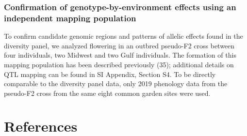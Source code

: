 \documentclass[
  9pt,
  twocolumn,
  twoside]{pnas-new}
\begin{document}
\subsubsection{Confirmation of genotype-by-environment effects using an
independent mapping
population}\label{confirmation-of-genotype-by-environment-effects-using-an-independent-mapping-population}

To confirm candidate genomic regions and patterns of allelic effects
found in the diversity panel, we analyzed flowering in an outbred
pseudo-F2 cross between four individuals, two Midwest and two Gulf
individuals. The formation of this mapping population has been described
previously (35); additional details on QTL mapping can be found in SI
Appendix, Section S4. To be directly comparable to the diversity panel
data, only 2019 phenology data from the pseudo-F2 cross from the same
eight common garden sites were used.

\section{References}\label{references}

\bibsplit[2]
\end{document}
